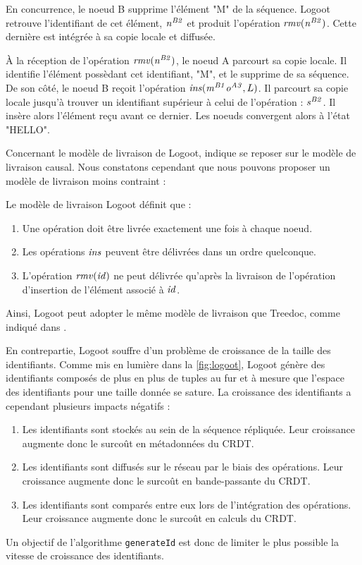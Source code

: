 En concurrence, le noeud B supprime l'élément "M" de la séquence.
Logoot retrouve l'identifiant de cet élément, $\mathit{n}^{\mathit{B2}}_{\mathit{}}$ et produit l'opération $\mathit{rmv}(\mathit{n}^{\mathit{B2}}_{\mathit{}})$.
Cette dernière est intégrée à sa copie locale et diffusée.

À la réception de l'opération $\mathit{rmv}(\mathit{n}^{\mathit{B2}}_{\mathit{}})$, le noeud A parcourt sa copie locale.
Il identifie l'élément possèdant cet identifiant, "M", et le supprime de sa séquence.
De son côté, le noeud B reçoit l'opération $\mathit{ins}(\mathit{m}^{\mathit{B1}}_{\mathit{}}\mathit{o}^{\mathit{A3}}_{\mathit{}}, L)$.
Il parcourt sa copie locale jusqu'à trouver un identifiant supérieur à celui de l'opération : $\mathit{s}^{\mathit{B2}}_{\mathit{}}$.
Il insère alors l'élément reçu avant ce dernier.
Les noeuds convergent alors à l'état "HELLO".

Concernant le modèle de livraison de Logoot, \cite{2009-logoot-weiss} indique se reposer sur le modèle de livraison causal.
Nous constatons cependant que nous pouvons proposer un modèle de livraison moins contraint :
\begin{definition}
  Le modèle de livraison Logoot définit que :
  \begin{enumerate}
    \item Une opération doit être livrée exactement une fois à chaque noeud.
    \item Les opérations $\mathit{ins}$ peuvent être délivrées dans un ordre quelconque.
    \item L'opération $\mathit{rmv}(\mathit{id})$ ne peut délivrée qu'après la livraison de l'opération d'insertion de l'élément associé à $\mathit{id}$.
  \end{enumerate}
\end{definition}
Ainsi, Logoot peut adopter le même modèle de livraison que Treedoc, comme indiqué dans \cite{2021-these-vic}.

En contrepartie, Logoot souffre d'un problème de croissance de la taille des identifiants.
Comme mis en lumière dans la \autoref{fig:logoot}, Logoot génère des identifiants composés de plus en plus de tuples au fur et à mesure que l'espace des identifiants pour une taille donnée se sature.
La croissance des identifiants a cependant plusieurs impacts négatifs :
\begin{enumerate}
  \item Les identifiants sont stockés au sein de la séquence répliquée.
    Leur croissance augmente donc le surcoût en métadonnées du \ac{CRDT}.
  \item Les identifiants sont diffusés sur le réseau par le biais des opérations.
    Leur croissance augmente donc le surcoût en bande-passante du \ac{CRDT}.
  \item Les identifiants sont comparés entre eux lors de l'intégration des opérations.
    Leur croissance augmente donc le surcoût en calculs du \ac{CRDT}.
\end{enumerate}
Un objectif de l'algorithme \texttt{generateId} est donc de limiter le plus possible la vitesse de croissance des identifiants.

